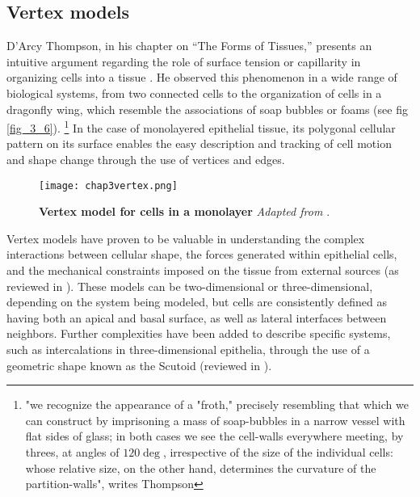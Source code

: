 \hypertarget{vertex-models}{%
	\subsection{Vertex models}\label{vertex-models}}

D'Arcy Thompson, in his chapter on ``The Forms of Tissues,'' presents an intuitive argument regarding the role of surface tension or capillarity in organizing cells into a tissue \cite{thompson1979, graner2017}. He observed this phenomenon in a wide range of biological systems, from two connected cells to the organization of cells in a dragonfly wing, which resemble the
associations of soap bubbles or foams (see fig \ref{fig_3_6}).
\footnote{"we recognize the appearance of a "froth," precisely resembling that which we can construct by imprisoning a mass of soap-bubbles in a narrow vessel with flat sides of glass; in both cases we see the cell-walls everywhere meeting, by threes, at angles of $120 \deg$, irrespective of the size of the individual cells: whose relative size, on the other hand, determines the curvature of the partition-walls", writes Thompson}
In the case of monolayered epithelial tissue, its polygonal cellular pattern on its surface enables the easy description and tracking of cell motion and shape change through the use of vertices and edges.
\begin{wrapfigure}{r}{5.5cm}
	\caption{\textbf{Vertex model for cells in a monolayer} \textit{Adapted from \cite{gomez-gonzalez2020}}.}\label{fig_3_7}
	\texttt{[image: chap3vertex.png]}
\end{wrapfigure} 
Vertex models have proven to be valuable in understanding the complex interactions between cellular shape, the forces generated within epithelial cells, and the mechanical constraints imposed on the tissue from external sources (as reviewed in \cite{alt2017}). These models can be two-dimensional or three-dimensional, depending on the system being modeled, but cells are consistently defined as having both an apical and basal surface, as well as lateral interfaces between neighbors. Further complexities have been added to describe specific systems, such as intercalations in three-dimensional epithelia, through the use of a geometric shape known as the Scutoid (reviewed in \cite{gomez-galvez2021}).

